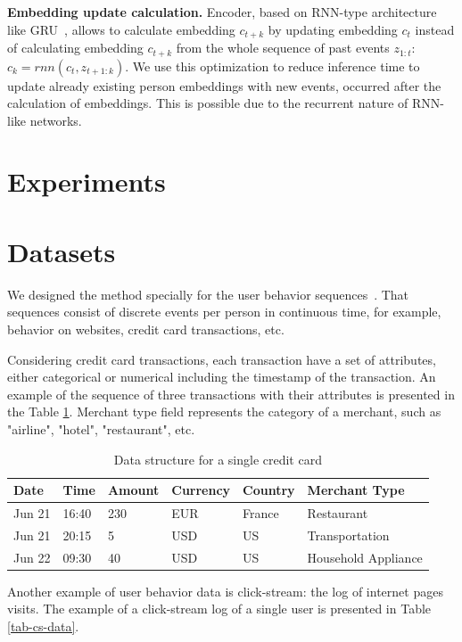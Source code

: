 \documentclass{article}
\begin{document}
\textbf{Embedding update calculation.} Encoder, based on RNN-type architecture like GRU~\cite{Cho2014LearningPR}, allows to calculate embedding $c_{t+k}$ by updating embedding $c_t$ instead of  calculating embedding $c_{t+k}$ from the whole sequence of past events $z_{1:t}$: $c_k = rnn(c_t, z_{t+1:k})$. We use this optimization to reduce inference time to update already existing person embeddings with new events, occurred after the calculation of embeddings. This is possible due to the recurrent nature of RNN-like networks.

\section{Experiments} \label{sec-exp}

\section{Datasets}

We designed the method specially for the user behavior sequences~\cite{Ni2018PerceiveYU}. That sequences consist of discrete events per person in continuous time, for example,  behavior on websites, credit card transactions, etc. 

Considering credit card transactions, each transaction have a set of attributes, either categorical or numerical including the timestamp of the transaction. An example of the sequence of three transactions with their attributes is presented in the Table \ref{tab-tr-data}.
Merchant type field represents the category of a merchant, such as "airline", "hotel", "restaurant", etc.

\begin{table}
\centering
\caption{Data structure for a single credit card}
\begin{tabular}{llllll}
\toprule
\textbf{Date} & \textbf{Time} & \textbf{Amount} & \textbf{Currency} & \textbf{Country} & \textbf{Merchant Type} \\
\midrule
Jun 21 & 16:40& 230 & EUR & France & Restaurant \\
Jun 21 & 20:15 & 5 & USD & US & Transportation \\
Jun 22 & 09:30 & 40 & USD & US & Household Appliance \\
\bottomrule
\end{tabular}
\label{tab-tr-data}
\end{table}

Another example of user behavior data is click-stream: the log of internet pages  visits. The example of a click-stream log of a single user is presented in Table \ref{tab-cs-data}.
\end{document}
